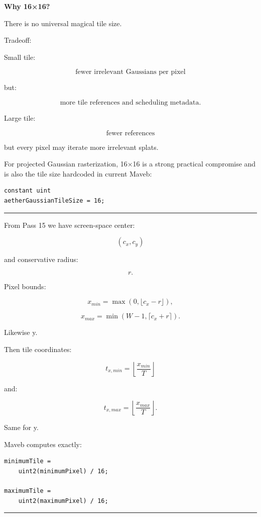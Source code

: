 \textbf{Why 16×16?}

There is no universal magical tile size.

Tradeoff:

Small tile:

\[
\text{fewer irrelevant Gaussians per pixel}
\]

but:

\[
\text{more tile references and scheduling metadata}.
\]

Large tile:

\[
\text{fewer references}
\]

but every pixel may iterate more irrelevant splats.

For projected Gaussian rasterization, 16×16 is a strong practical compromise and is also the tile size hardcoded in current Maveb:

\begin{verbatim}
constant uint
aetherGaussianTileSize = 16;
\end{verbatim}

\begin{center}\rule{0.5\linewidth}{0.5pt}\end{center}

From Pass 15 we have screen-space center:

\[
(c_x,c_y)
\]

and conservative radius:

\[
r.
\]

Pixel bounds:

\[
x_{min}
=
\max(
0,
\lfloor c_x-r\rfloor
),
\]

\[
x_{max}
=
\min(
W-1,
\lceil c_x+r\rceil
).
\]

Likewise y.

Then tile coordinates:

\[
\boxed{
t_{x,min}
=
\left\lfloor
\frac{x_{min}}T
\right\rfloor
}
\]

and:

\[
\boxed{
t_{x,max}
=
\left\lfloor
\frac{x_{max}}T
\right\rfloor.
}
\]

Same for y.

Maveb computes exactly:

\begin{verbatim}
minimumTile =
    uint2(minimumPixel) / 16;

maximumTile =
    uint2(maximumPixel) / 16;
\end{verbatim}

\begin{center}\rule{0.5\linewidth}{0.5pt}\end{center}

